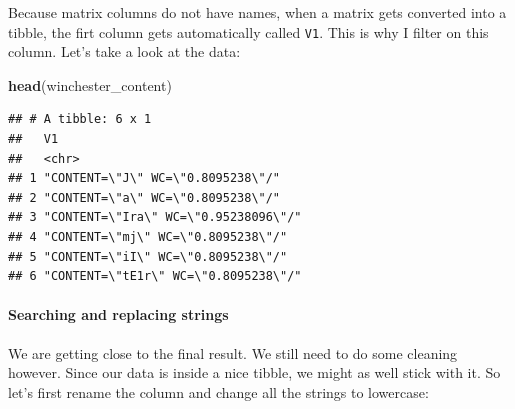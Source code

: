 \documentclass[]{gitbook}
\newenvironment{Shaded}{\begin{snugshade}}{\end{snugshade}}
\newcommand{\DataTypeTok}[1]{\textcolor[rgb]{0.13,0.29,0.53}{#1}}
\newcommand{\KeywordTok}[1]{\textcolor[rgb]{0.13,0.29,0.53}{\textbf{#1}}}
\newcommand{\NormalTok}[1]{#1}
\newcommand{\OperatorTok}[1]{\textcolor[rgb]{0.81,0.36,0.00}{\textbf{#1}}}
\newcommand{\StringTok}[1]{\textcolor[rgb]{0.31,0.60,0.02}{#1}}
\let\oldparagraph\paragraph
\renewcommand{\paragraph}[1]{\oldparagraph{#1}\mbox{}}
\begin{document}
\begin{Shaded}
\end{Shaded}

Because matrix columns do not have names, when a matrix gets converted into a tibble, the firt column
gets automatically called \texttt{V1}. This is why I filter on this column. Let's take a look at the data:

\begin{Shaded}
\begin{Highlighting}[]
\KeywordTok{head}\NormalTok{(winchester_content)}
\end{Highlighting}
\end{Shaded}

\begin{verbatim}
## # A tibble: 6 x 1
##   V1                                  
##   <chr>                               
## 1 "CONTENT=\"J\" WC=\"0.8095238\"/"   
## 2 "CONTENT=\"a\" WC=\"0.8095238\"/"   
## 3 "CONTENT=\"Ira\" WC=\"0.95238096\"/"
## 4 "CONTENT=\"mj\" WC=\"0.8095238\"/"  
## 5 "CONTENT=\"iI\" WC=\"0.8095238\"/"  
## 6 "CONTENT=\"tE1r\" WC=\"0.8095238\"/"
\end{verbatim}

\hypertarget{searching-and-replacing-strings}{%
\paragraph{Searching and replacing strings}\label{searching-and-replacing-strings}}

We are getting close to the final result. We still need to do some cleaning however. Since our data
is inside a nice tibble, we might as well stick with it. So let's first rename the column and
change all the strings to lowercase:

\begin{Shaded}
\end{Shaded}
\end{document}
